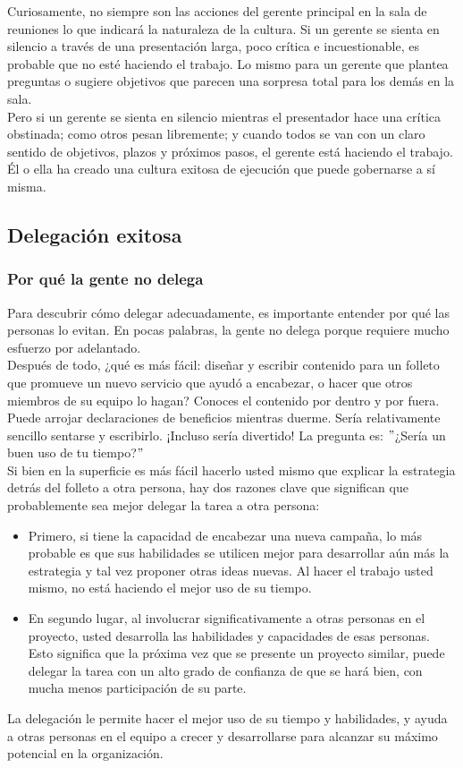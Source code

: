 \documentclass[10pt]{book}
\begin{document}
Curiosamente, no siempre son las acciones del gerente principal en la sala de reuniones lo que indicará la naturaleza de la cultura. Si un gerente se sienta en silencio a través de una presentación larga, poco crítica e incuestionable, es probable que no esté haciendo el trabajo. Lo mismo para un gerente que plantea preguntas o sugiere objetivos que parecen una sorpresa total para los demás en la sala.\\
Pero si un gerente se sienta en silencio mientras el presentador hace una crítica obstinada; como otros pesan libremente; y cuando todos se van con un claro sentido de objetivos, plazos y próximos pasos, el gerente está haciendo el trabajo. Él o ella ha creado una cultura exitosa de ejecución que puede gobernarse a sí misma.
\subsection{Delegación exitosa}
\subsubsection{Por qué la gente no delega}
Para descubrir cómo delegar adecuadamente, es importante entender por qué las personas lo evitan. En pocas palabras, la gente no delega porque requiere mucho esfuerzo por adelantado.\\
Después de todo, ¿qué es más fácil: diseñar y escribir contenido para un folleto que promueve un nuevo servicio que ayudó a encabezar, o hacer que otros miembros de su equipo lo hagan? Conoces el contenido por dentro y por fuera. Puede arrojar declaraciones de beneficios mientras duerme. Sería relativamente sencillo sentarse y escribirlo. ¡Incluso sería divertido! La pregunta es: $"$¿Sería un buen uso de tu tiempo?$"$\\
Si bien en la superficie es más fácil hacerlo usted mismo que explicar la estrategia detrás del folleto a otra persona, hay dos razones clave que significan que probablemente sea mejor delegar la tarea a otra persona:
\begin{itemize}
\item Primero, si tiene la capacidad de encabezar una nueva campaña, lo más probable es que sus habilidades se utilicen mejor para desarrollar aún más la estrategia y tal vez proponer otras ideas nuevas. Al hacer el trabajo usted mismo, no está haciendo el mejor uso de su tiempo.
\item En segundo lugar, al involucrar significativamente a otras personas en el proyecto, usted desarrolla las habilidades y capacidades de esas personas. Esto significa que la próxima vez que se presente un proyecto similar, puede delegar la tarea con un alto grado de confianza de que se hará bien, con mucha menos participación de su parte.
\end{itemize}
La delegación le permite hacer el mejor uso de su tiempo y habilidades, y ayuda a otras personas en el equipo a crecer y desarrollarse para alcanzar su máximo potencial en la organización.
\end{document}
